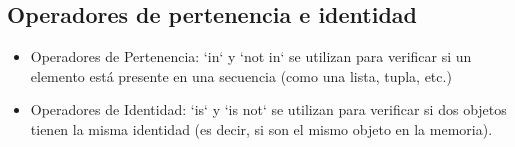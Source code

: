\newpage

\subsection{Operadores de pertenencia e identidad}
\begin{itemize}
    \item Operadores de Pertenencia: `in` y `not in` se utilizan para verificar si un elemento está presente en una secuencia (como una lista, tupla, etc.)
    \begin{figure}[h]
      \centering
    \end{figure}

    \item Operadores de Identidad: `is` y `is not` se utilizan para verificar si dos objetos tienen la misma identidad (es decir, si son el mismo objeto en la memoria).
    \begin{figure}[h]
      \centering
    \end{figure}
  \end{itemize}
  \newpage

